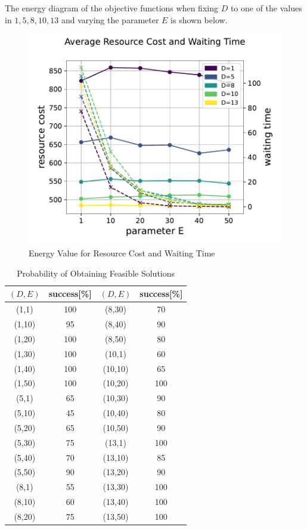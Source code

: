 \documentclass[conference]{IEEEtran}
\begin{document}
The energy diagram of the objective functions when fixing $D$ to one of the values in ${1, 5, 8, 10, 13}$ and varying the parameter $E$ is shown below.

\begin{figure}[htbp]
\centerline{\includegraphics[scale=0.5]{./fig/D.pdf}}
\caption{Energy Value for Resource Cost and Waiting Time}
\label{fig2}
\end{figure}

\begin{table}[h] 
\centering 
\caption{Probability of Obtaining Feasible Solutions} 
\label{feasible} 
\begin{tabular}{|c|c|c|c|} \hline 
$(D,E)$ & success[\%] & $(D,E)$ & success[\%] \\ \hline 
(1,1) & 100 & (8,30) & 70 \\ \hline 
(1,10) & 95 & (8,40) & 90 \\ \hline 
(1,20) & 100 & (8,50) & 80 \\ \hline 
(1,30) & 100 & (10,1) & 60 \\ \hline 
(1,40) & 100 & (10,10) & 65 \\ \hline 
(1,50) & 100 & (10,20) & 100 \\ \hline 
(5,1) & 65 & (10,30) & 90 \\ \hline
 (5,10) & 45 & (10,40) & 80 \\ \hline
 (5,20) & 65 & (10,50) & 90 \\ \hline
 (5,30) & 75 & (13,1) & 100 \\ \hline 
 (5,40) & 70 & (13,10) & 85 \\ \hline
 (5,50) & 90 & (13,20) & 90 \\ \hline
 (8,1) & 55 & (13,30) & 100 \\ \hline
 (8,10) & 60 & (13,40) & 100 \\ \hline 
 (8,20) & 75 & (13,50) & 100 \\ \hline
 \end{tabular} 
 \end{table}
\end{document}
